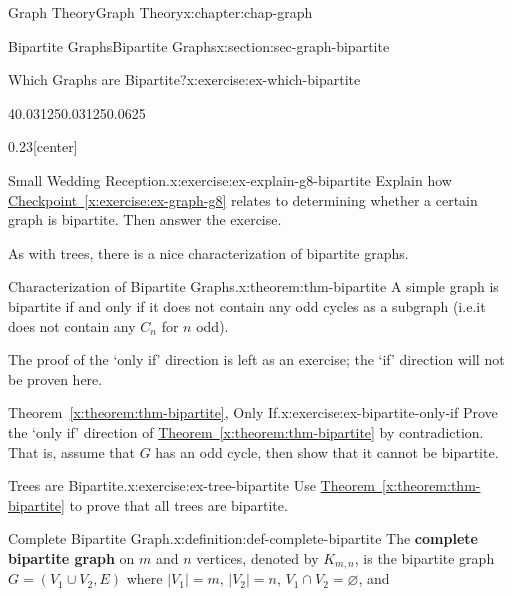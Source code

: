 \documentclass[oneside,10pt,]{book}
\newcommand{\xreffont}{\relax}
\newcommand{\terminology}[1]{\textbf{#1}}
\numberwithin{equation}{section}
\begin{document}
\begin{chapterptx}{Graph Theory}{}{Graph Theory}{}{}{x:chapter:chap-graph}
\begin{sectionptx}{Bipartite Graphs}{}{Bipartite Graphs}{}{}{x:section:sec-graph-bipartite}
\begin{inlineexercise}{Which Graphs are Bipartite?}{x:exercise:ex-which-bipartite}
\begin{sidebyside}{4}{0.03125}{0.03125}{0.0625}
\begin{sbspanel}{0.23}[center]
{
}%
\end{sbspanel}%
\end{sidebyside}%
\end{inlineexercise}
\begin{inlineexercise}{Small Wedding Reception.}{x:exercise:ex-explain-g8-bipartite}%
Explain how \hyperref[x:exercise:ex-graph-g8]{Checkpoint~{\xreffont\ref{x:exercise:ex-graph-g8}}} relates to determining whether a certain graph is bipartite. Then answer the exercise.%
\end{inlineexercise}
As with trees, there is a nice characterization of bipartite graphs.%
\begin{theorem}{Characterization of Bipartite Graphs.}{}{x:theorem:thm-bipartite}%
A simple graph is bipartite if and only if it does not contain any odd cycles as a subgraph (i.e.\@ it does not contain any \(C_n\) for \(n\) odd).%
\end{theorem}
The proof of the `only if' direction is left as an exercise; the `if' direction will not be proven here.%
\begin{inlineexercise}{Theorem~{\xreffont\ref*{x:theorem:thm-bipartite}}, Only If.}{x:exercise:ex-bipartite-only-if}%
Prove the `only if' direction of \hyperref[x:theorem:thm-bipartite]{Theorem~{\xreffont\ref{x:theorem:thm-bipartite}}} by contradiction. That is, assume that \(G\) has an odd cycle, then show that it cannot be bipartite.%
\end{inlineexercise}
\begin{inlineexercise}{Trees are Bipartite.}{x:exercise:ex-tree-bipartite}%
Use \hyperref[x:theorem:thm-bipartite]{Theorem~{\xreffont\ref{x:theorem:thm-bipartite}}} to prove that all trees are bipartite.%
\end{inlineexercise}
\begin{definition}{Complete Bipartite Graph.}{x:definition:def-complete-bipartite}%
The \terminology{complete bipartite graph} on \(m\) and \(n\) vertices, denoted by \(K_{m,n}\), is the bipartite graph \(G = (V_1 \cup V_2, E)\) where \(|V_1| = m\), \(|V_2| = n\), \(V_1 \cap V_2 = \varnothing\), and%

\end{definition}
\end{sectionptx}
\end{chapterptx}
\end{document}
